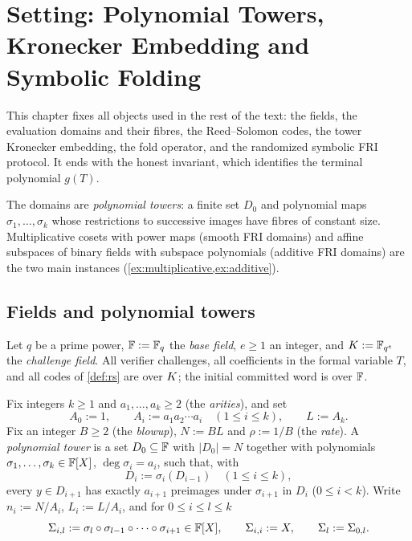 \chapter[Setting: Towers, Kronecker Map, Folding]{Setting: Polynomial Towers, Kronecker Embedding and Symbolic Folding}
\label{ch:setting}

This chapter fixes all objects used in the rest of the text: the fields, the evaluation
domains and their fibres, the Reed--Solomon codes, the tower Kronecker embedding, the
fold operator, and the randomized symbolic FRI protocol. It ends with the honest
invariant, which identifies the terminal polynomial $g(T)$.

The domains are \emph{polynomial towers}: a finite set $D_0$ and polynomial maps
$\sigma_1,\dots,\sigma_k$ whose restrictions to successive images have fibres of constant
size. Multiplicative cosets with power maps (smooth FRI domains) and affine subspaces
of binary fields with subspace polynomials (additive FRI domains) are the two main
instances (\cref{ex:multiplicative,ex:additive}).

\section{Fields and polynomial towers}

\begin{definition}[Fields]\label{def:fields}
Let $q$ be a prime power, $\mathbb{F}:=\mathbb{F}_q$ the \emph{base field}, $e\ge 1$ an integer, and
$K:=\mathbb{F}_{q^e}$ the \emph{challenge field}. All verifier challenges, all coefficients in the
formal variable $T$, and all codes of \cref{def:rs} are over $K$; the initial committed
word is over $\mathbb{F}$.
\end{definition}

\begin{definition}\label{def:domain}
Fix integers $k\ge1$ and $a_1,\dots,a_k\ge2$ (the \emph{arities}), and set
\[
A_0:=1,\qquad A_i:=a_1a_2\cdots a_i\quad(1\le i\le k),\qquad L:=A_k .
\]
Fix an integer $B\ge2$ (the \emph{blowup}), $N:=BL$ and $\rho:=1/B$ (the \emph{rate}).
A \emph{polynomial tower} is a set $D_0\subseteq\mathbb{F}$ with $|D_0|=N$ together with
polynomials $\sigma_1,\dots,\sigma_k\in\mathbb{F}[X]$, $\deg\sigma_i=a_i$, such that, with
\[
D_i:=\sigma_i(D_{i-1})\quad(1\le i\le k),
\]
every $y\in D_{i+1}$ has exactly $a_{i+1}$ preimages under $\sigma_{i+1}$ in $D_i$
($0\le i<k$). Write $n_i:=N/A_i$, $L_i:=L/A_i$, and for $0\le i\le l\le k$
\[
\Sigma_{i,l}:=\sigma_l\circ\sigma_{l-1}\circ\cdots\circ\sigma_{i+1}\in\mathbb{F}[X],\qquad
\Sigma_{i,i}:=X,\qquad \Sigma_l:=\Sigma_{0,l}.
\]
\end{definition}

